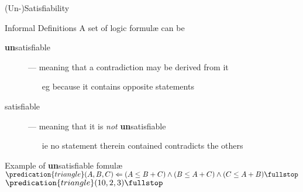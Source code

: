 \documentclass[presentation]{beamer}\mode<presentation>{\usetheme{AMSBolognaFC}}
\begin{document}
\begin{frame}{(Un-)Satisfiability}
    \begin{block}{Informal Definitions}
        A \alert{set} of logic formul\ae{} can be
        \begin{description}
            \item[\textbf{un}satisfiable] --- meaning that a \alert{contradiction} may be derived from it
            \begin{itemize}
                \item[eg] because it contains opposite statements
            \end{itemize}

            \item[satisfiable] --- meaning that it is \emph{not} \textbf{un}satisfiable
            \begin{itemize}
                \item[ie] no statement therein contained contradicts the others
            \end{itemize}
        \end{description}
    \end{block}

    \begin{exampleblock}{Example of \textbf{un}satisfiable fomul\ae{}}
        \centering
        $\predication{triangle}(A, B, C) \Leftarrow (A \leq B + C) \wedge (B \leq A + C) \wedge (C \leq A + B)  \fullstop$
        \\
        $\predication{triangle}(10, 2, 3) \fullstop$
    \end{exampleblock}

\end{frame}
\end{document}
